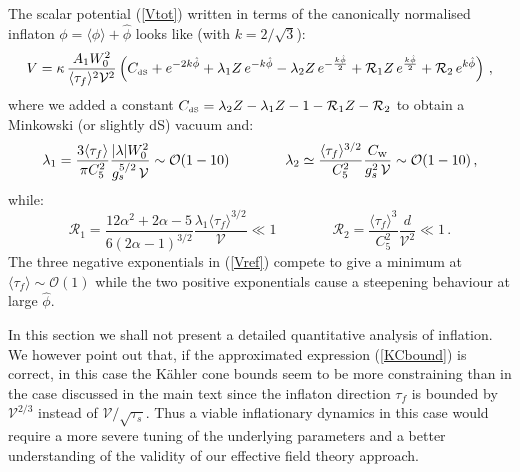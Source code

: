 \documentclass[11pt,a4paper]{article}
\newcommand{\be}{\begin{equation}}
\newcommand{\ee}{\end{equation}}
\def\nn{\nonumber}
\def\W{{\scriptscriptstyle \rm W}}
\def\dS{{\scriptscriptstyle \rm dS}}
\newcommand\vo{{\mathcal{V}}}
\newcommand{\mc}{\mathcal}
\begin{document}
The scalar potential (\ref{Vtot}) written in terms of the canonically normalised inflaton $\phi = \langle \phi \rangle + \hat\phi$ looks like (with $k=2/\sqrt{3}$):
\be
V = \kappa\,\frac{A_1 W_0^2}{\langle \tau_f \rangle^2 \vo^2} \left(C_\dS+ e^{-2 k \hat\phi}+\lambda_1 Z\,e^{-k\hat\phi}- \lambda_2 Z\,e^{-\frac{k \hat\phi}{2}} + \mc{R}_1 Z\, e^{\frac{k \hat\phi}{2}}+ \mc{R}_2\, e^{k \hat\phi}\right)\,,
\label{Vref}
\ee
where we added a constant $C_\dS=\lambda_2 Z-\lambda_1 Z -1 - \mc{R}_1 Z -\mc{R}_2$ to obtain a Minkowski (or slightly dS) vacuum and:
\be
\lambda_1 = \frac{3\langle\tau_f\rangle}{\pi C_5^2} \frac{|\lambda| W_0^2}{g_s^{5/2}\,\vo}\sim\mc{O}(1-10)
\qquad \qquad\lambda_2 \simeq \frac{\langle\tau_f\rangle^{3/2}}{C_5^2} \frac{C_\W }{g_s^2\,\vo}\sim\mc{O}(1-10)\,, \nn
\ee
while:
\be
\mc{R}_1 = \frac{12\alpha^2+2\alpha-5}{6(2\alpha-1)^{3/2}} \frac{\lambda_1\langle\tau_f\rangle^{3/2}}{\vo} \ll 1
\qquad\qquad
\mc{R}_2 = \frac{\langle\tau_f\rangle^3}{C_5^2} \frac{d}{\vo^2} \ll 1\,. \nn
\ee
The three negative exponentials in (\ref{Vref}) compete to give a minimum at $\langle\tau_f\rangle \sim\mc{O}(1)$ while the two positive exponentials cause a steepening behaviour at large $\hat\phi$. 

In this section we shall not present a detailed quantitative analysis of inflation. We however point out that, if the approximated expression (\ref{KCbound}) is correct, in this case the K\"ahler cone bounds seem to be more constraining than in the case discussed in the main text since the inflaton direction $\tau_f$ is bounded by $\vo^{2/3}$ instead of $\vo/\sqrt{\tau_s}$. Thus a viable inflationary dynamics in this case would require a more severe tuning of the underlying parameters and a better understanding of the validity of our effective field theory approach.
\end{document}
